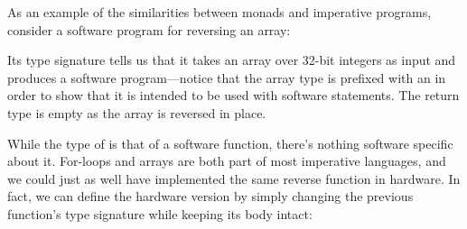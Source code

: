 \documentclass[../main.tex]{subfiles}
\begin{document}
As an example of the similarities between monads and imperative programs, consider a software program for reversing an array:


\noindent Its type signature tells us that it takes an array over 32-bit integers as input and produces a software program---notice that the array type  is prefixed with an  in order to show that it is intended to be used with software statements. The return type is empty as the array is reversed in place.




While the type of  is that of a software function, there's nothing software specific about it. For-loops and arrays are both part of most imperative languages, and we could just as well have implemented the same reverse function in hardware. In fact, we can define the hardware version by simply changing the previous function's type signature while keeping its body intact:
\end{document}
